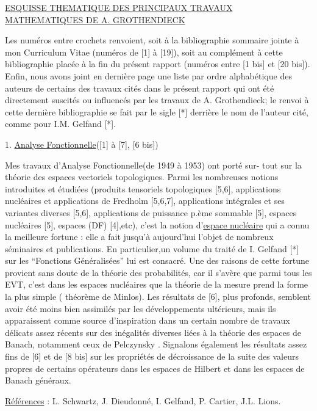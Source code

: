 \uline{ESQUISSE THEMATIQUE DES PRINCIPAUX TRAVAUX MATHEMATIQUES DE A. GROTHENDIECK}

Les numéros entre crochets renvoient, soit à la bibliographie sommaire
jointe à mon Curriculum Vitae (numéros de [1] à [19]), soit au complément à
cette bibliographie placée à la fin du présent rapport (numéros entre [1 bis]
et [20 bis]). Enfin, nous avons joint en dernière page une liste par ordre
alphabétique des auteurs de certains des travaux cités dans le présent
rapport qui ont été directement suscités ou influencés par les travaux de
A. Grothendieck; le renvoi à cette dernière bibliographie se fait par le sigle
[*] derrière le nom de l'auteur cité, comme pour I.M. Gelfand [*].

1. \uline{Analyse Fonctionnelle}([1] à [7], [6 bis])

Mes travaux d'Analyse Fonctionnelle(de 1949 à 1953) ont porté sur-%
tout sur la théorie des espaces vectoriels topologiques. Parmi les nombreuses
notions introduites et étudiées (produits tensoriels topologiques [5,6],
applications nucléaires et applications de Fredholm [5,6,7], applications
intégrales et ses variantes diverses [5,6], applications de puissance p.ème
sommable [5], espaces nucléaires [5], espaces (DF) [4],etc), c'est la notion
d'\uline{espace nucléaire} qui a connu la meilleure fortune : elle a fait jusqu'à
aujourd'hui l'objet de nombreux séminaires et publications. En particulier,un
volume du traité de I. Gelfand [*] sur les ``Fonctions Généralisées'' lui est
consacré. Une des raisons de cette fortune provient sans doute de la théorie
des probabilités, car il s'avère que parmi tous les EVT, c'est dans les espaces
nucléaires que la théorie de la mesure prend la forme la plus simple ( théorème
de Minlos). Les résultats de [6], plus profonds, semblent avoir été moins bien
assimilés par les développements ultérieurs, mais ils apparaissent comme source
d'inspiration dans un certain nombre de travaux délicats assez récents sur des
inégalités diverses liées à la théorie des espaces de Banach, notamment ceux
de Pelczynsky . \quad Signalons également les résultats assez fins de [6] et de
[8 bis] sur les propriétés de décroissance de la suite des valeurs propres de
certains opérateurs dans les espaces de Hilbert et dans les espaces de Banach
généraux.

\uline{Références} : L. Schwartz, J. Dieudonné, I. Gelfand, P. Cartier, J.L. Lions.

